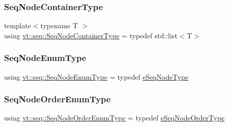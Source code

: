 \mbox{\label{namespacevt_1_1seq_ad2b106b952becc168d3c567411ebf899}} 
\subsubsection{\texorpdfstring{Seq\+Node\+Container\+Type}{SeqNodeContainerType}}
{\footnotesize\ttfamily template$<$typename T $>$ \\
using \hyperlink{namespacevt_1_1seq_ad2b106b952becc168d3c567411ebf899}{vt\+::seq\+::\+Seq\+Node\+Container\+Type} = typedef std\+::list$<$T$>$}

\mbox{\label{namespacevt_1_1seq_a99cbd4cc79e0376ab97a7868a4de7c97}} 
\subsubsection{\texorpdfstring{Seq\+Node\+Enum\+Type}{SeqNodeEnumType}}
{\footnotesize\ttfamily using \hyperlink{namespacevt_1_1seq_ae721d4e8b95cf57a7e4169db1929e0f1}{vt\+::seq\+::\+Seq\+Node\+Enum\+Type} = typedef \hyperlink{namespacevt_1_1seq_ae721d4e8b95cf57a7e4169db1929e0f1}{e\+Seq\+Node\+Type}}

\mbox{\label{namespacevt_1_1seq_aa68ba04b78f90a392a0647636b07f572}} 
\subsubsection{\texorpdfstring{Seq\+Node\+Order\+Enum\+Type}{SeqNodeOrderEnumType}}
{\footnotesize\ttfamily using \hyperlink{namespacevt_1_1seq_a313357c71bba2bea5c57f50d69f1edf7}{vt\+::seq\+::\+Seq\+Node\+Order\+Enum\+Type} = typedef \hyperlink{namespacevt_1_1seq_a313357c71bba2bea5c57f50d69f1edf7}{e\+Seq\+Node\+Order\+Type}}

\mbox{\label{namespacevt_1_1seq_ae6a4874b585be0612aaca32ca6d2d191}} 
